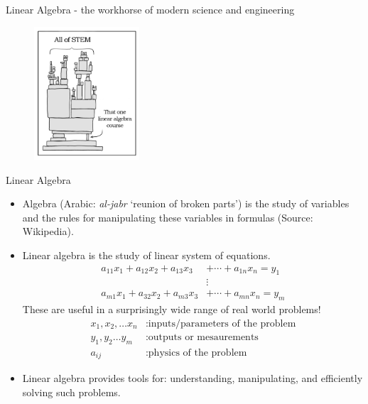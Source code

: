 \documentclass[aspectratio=169]{beamer}
\let\olditem\item
\renewcommand{\item}{\setlength{\itemsep}{\fill}\olditem}
\begin{document}
\begin{frame}[t]{Linear Algebra - the workhorse of modern science and engineering}
\begin{figure}
  \centering 
  \includegraphics[width=0.35\textwidth]{../../truth.png}
\end{figure}
\end{frame}


\begin{frame}[t]{Linear Algebra}
\begin{itemize}
  \item Algebra (Arabic: \textit{al-jabr} `reunion of broken parts') is the study of variables and the rules for manipulating these variables in formulas (Source: Wikipedia).
  
  \item Linear algebra is the study of linear system of equations.
  \[
    \begin{split}
      a_{11} x_1 + a_{12} x_2 + a_{13} x_3 &+ \cdots + a_{1n} x_n = y_1\\
      &\vdots \\ 
      a_{m1} x_1 + a_{32} x_2 + a_{m3} x_3 &+ \cdots + a_{mn} x_n = y_m
    \end{split}
  \]
  These are useful in a surprisingly wide range of real world problems!
  \[ 
    \begin{split}
      x_1, x_2, \ldots x_n &: \text{inputs/parameters of the problem}\\
      y_1, y_2 \ldots y_m &: \text{outputs or mesaurements}\\
      a_{ij} &: \text{physics of the problem}
    \end{split}
  \]
  \item Linear algebra provides tools for: understanding, manipulating, and efficiently solving such problems.
\end{itemize}
\end{frame}
\end{document}
